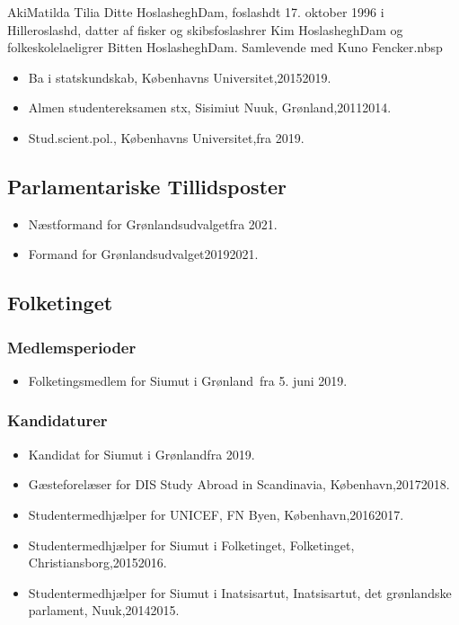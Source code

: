 \documentclass[11pt, a4paper]{awesome-cv}
\begin{document}
\makecvheader[R]
\makelettertitle
\begin{cvletter}
AkiMatilda Tilia Ditte HoslasheghDam, foslashdt 17. oktober 1996 i Hilleroslashd, datter af fisker og skibsfoslashrer Kim HoslasheghDam og folkeskolelaeligrer Bitten HoslasheghDam. Samlevende med Kuno Fencker.nbsp

\begin{itemize}
\item Ba i statskundskab, Københavns Universitet,20152019.
\item Almen studentereksamen stx, Sisimiut  Nuuk, Grønland,20112014.
\item Stud.scient.pol., Københavns Universitet,fra 2019.
\end{itemize}
\subsection*{Parlamentariske Tillidsposter}
\begin{itemize}
\item Næstformand for Grønlandsudvalgetfra 2021.
\item Formand for Grønlandsudvalget20192021.
\end{itemize}
\subsection*{Folketinget}
\subsubsection*{Medlemsperioder}
\begin{itemize}
\item Folketingsmedlem for Siumut i Grønland fra 5. juni 2019.
\end{itemize}
\subsubsection*{Kandidaturer}
\begin{itemize}
\item Kandidat for Siumut i Grønlandfra 2019.
\end{itemize}
\begin{itemize}
\item Gæsteforelæser for DIS Study Abroad in Scandinavia, København,20172018.
\item Studentermedhjælper for UNICEF, FN Byen, København,20162017.
\item Studentermedhjælper for Siumut i Folketinget, Folketinget, Christiansborg,20152016.
\item Studentermedhjælper for Siumut i Inatsisartut, Inatsisartut, det grønlandske parlament, Nuuk,20142015.
\end{itemize}
\end{cvletter}
\end{document}
